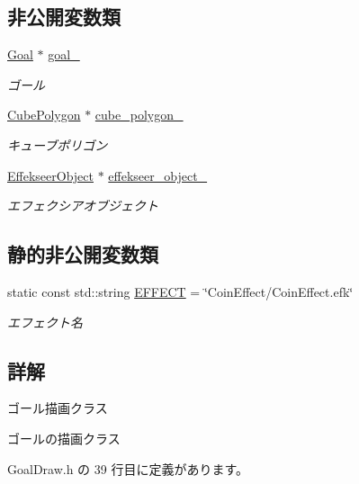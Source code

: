 \subsection*{非公開変数類}
\begin{DoxyCompactItemize}
\item 
\mbox{\hyperlink{class_goal}{Goal}} $\ast$ \mbox{\hyperlink{class_goal_draw_abbb3b4db65f3908bad9b918c6feb6a7a}{goal\+\_\+}}
\begin{DoxyCompactList}\small\item\em ゴール \end{DoxyCompactList}\item 
\mbox{\hyperlink{class_cube_polygon}{Cube\+Polygon}} $\ast$ \mbox{\hyperlink{class_goal_draw_add3ff2a5f7cd52a76ccfb95c27aa8a07}{cube\+\_\+polygon\+\_\+}}
\begin{DoxyCompactList}\small\item\em キューブポリゴン \end{DoxyCompactList}\item 
\mbox{\hyperlink{class_effekseer_object}{Effekseer\+Object}} $\ast$ \mbox{\hyperlink{class_goal_draw_a2d4449f780f6b6fd6dd3e8763fc67b2d}{effekseer\+\_\+object\+\_\+}}
\begin{DoxyCompactList}\small\item\em エフェクシアオブジェクト \end{DoxyCompactList}\end{DoxyCompactItemize}
\subsection*{静的非公開変数類}
\begin{DoxyCompactItemize}
\item 
static const std\+::string \mbox{\hyperlink{class_goal_draw_a1600b9846c344c03b4bae2919674ed90}{E\+F\+F\+E\+CT}} = \char`\"{}Coin\+Effect/Coin\+Effect.\+efk\char`\"{}
\begin{DoxyCompactList}\small\item\em エフェクト名 \end{DoxyCompactList}\end{DoxyCompactItemize}


\subsection{詳解}
ゴール描画クラス 

ゴールの描画クラス 

 Goal\+Draw.\+h の 39 行目に定義があります。




